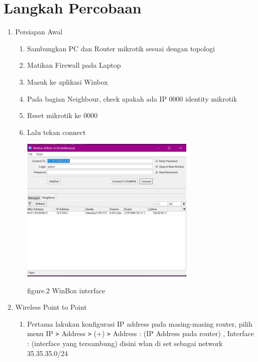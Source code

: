 \section{Langkah Percobaan}
\begin{enumerate}
    \item Persiapan Awal
    
    \begin{enumerate}
        \item Sambungkan PC dan Router mikrotik sesuai dengan topologi
        \item Matikan Firewall pada Laptop
        \item Masuk ke aplikasi Winbox
        \item Pada bagian Neighbour, check apakah ada IP 0000 identity mikrotik
        \item Reset mikrotik ke 0000
        \item Lalu tekan connect
        
        \begin{center}
            \includegraphics[width=0.7\textwidth]{image/Winbox-interface.png}    
            
            figure.2 WinBox interface
        \end{center}

    \end{enumerate}

    \item Wireless Point to Point
    
    \begin{enumerate}
        \item Pertama lakukan konfigurasi IP address pada masing-masing router, pilih menu IP \texttt{\text>} Address \texttt{\text>} (+) \texttt{\text>} Address : (IP Address pada router) , Interface : (interface yang tersambung)
        disini wlan di set sebagai network 35.35.35.0/24
        

\end{enumerate}
\end{enumerate}
